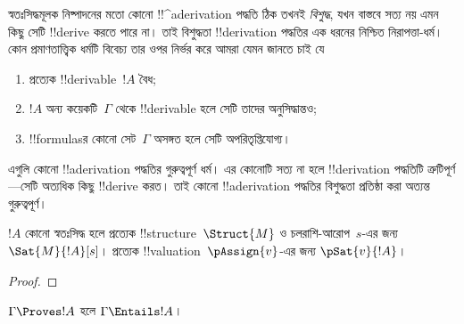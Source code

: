 \documentclass[../../../include/open-logic-section]{subfiles}
\begin{document}
      {}
      {}


\begin{explain}
স্বতঃসিদ্ধমূলক নিষ্পাদনের মতো কোনো !!^a{derivation} পদ্ধতি ঠিক তখনই
\emph{বিশুদ্ধ}, যখন বাস্তবে সত্য নয় এমন কিছু সেটি !!{derive} করতে
পারে না। তাই বিশুদ্ধতা !!{derivation} পদ্ধতির এক ধরনের নিশ্চিত
নিরাপত্তা-ধর্ম। কোন প্রমাণতাত্ত্বিক ধর্মটি বিবেচ্য তার ওপর নির্ভর করে
আমরা যেমন জানতে চাই যে
\begin{enumerate}
\item প্রত্যেক !!{derivable}~$!A$ বৈধ;
\item $!A$ অন্য কয়েকটি~$\Gamma$ থেকে !!{derivable} হলে সেটি তাদের
  অনুসিদ্ধান্তও;
\item !!{formula}sর কোনো সেট~$\Gamma$ অসঙ্গত হলে সেটি
  অপরিতৃপ্তিযোগ্য।
\end{enumerate}
এগুলি কোনো !!a{derivation} পদ্ধতির গুরুত্বপূর্ণ ধর্ম। এর কোনোটি সত্য
না হলে !!{derivation} পদ্ধতিটি ত্রুটিপূর্ণ—সেটি অত্যধিক কিছু
!!{derive} করত। তাই কোনো !!a{derivation} পদ্ধতির বিশুদ্ধতা প্রতিষ্ঠা
করা অত্যন্ত গুরুত্বপূর্ণ।
\end{explain}

\begin{prop}
  $!A$ কোনো স্বতঃসিদ্ধ হলে
    {প্রত্যেক !!{structure}~$\Struct{M}$ ও চলরাশি-আরোপ~$s$-এর জন্য $\Sat{M}{!A}[s]$।}
    {প্রত্যেক !!{valuation}~$\pAssign{v}$-এর জন্য $\pSat{v}{!A}$।}
\end{prop}

\begin{proof}
\end{proof}

\begin{thm}[বিশুদ্ধতা]
$\Gamma \Proves !A$ হলে $\Gamma \Entails !A$।
\end{thm}
\end{document}
